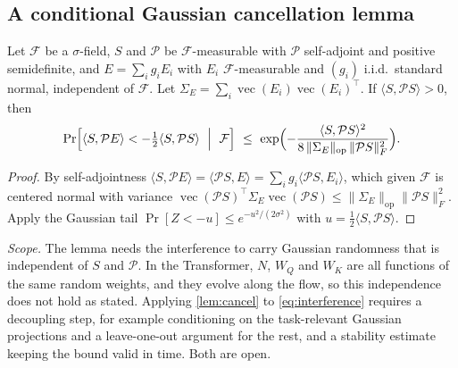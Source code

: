 \subsection{A conditional Gaussian cancellation lemma}\label{app:cancel}
\begin{lemma}\label{lem:cancel}
Let $\mathcal F$ be a $\sigma$-field, $S$ and $\mathcal P$ be $\mathcal F$-measurable with $\mathcal P$ self-adjoint and positive semidefinite, and
$E=\sum_ig_iE_i$ with $E_i$ $\mathcal F$-measurable and $(g_i)$ i.i.d.\ standard normal, independent of $\mathcal F$. Let
$\Sigma_E=\sum_i\operatorname{vec}(E_i)\operatorname{vec}(E_i)^\top$. If $\langle S,\mathcal PS\rangle>0$, then
\[
 \Pr\Bigl[\langle S,\mathcal PE\rangle<-\tfrac12\langle S,\mathcal PS\rangle\ \Bigm|\ \mathcal F\Bigr]\ \le\
 \exp\Bigl(-\frac{\langle S,\mathcal PS\rangle^2}{8\,\|\Sigma_E\|_{\mathrm{op}}\,\|\mathcal PS\|_F^2}\Bigr).
\]
\end{lemma}
\begin{proof}
By self-adjointness $\langle S,\mathcal PE\rangle=\langle\mathcal PS,E\rangle=\sum_ig_i\langle\mathcal PS,E_i\rangle$, which given $\mathcal F$ is centered normal with
variance $\operatorname{vec}(\mathcal PS)^\top\Sigma_E\operatorname{vec}(\mathcal PS)\le\|\Sigma_E\|_{\mathrm{op}}\|\mathcal PS\|_F^2$. Apply the Gaussian tail
$\Pr[Z<-u]\le e^{-u^2/(2\sigma^2)}$ with $u=\frac12\langle S,\mathcal PS\rangle$.
\end{proof}
\emph{Scope.} The lemma needs the interference to carry Gaussian randomness that is independent of $S$ and $\mathcal P$. In the Transformer,
$N$, $W_Q$ and $W_K$ are all functions of the same random weights, and they evolve along the flow, so this independence does not hold as stated.
Applying \cref{lem:cancel} to \cref{eq:interference} requires a decoupling step, for example conditioning on the task-relevant Gaussian
projections and a leave-one-out argument for the rest, and a stability estimate keeping the bound valid in time. Both are open.

